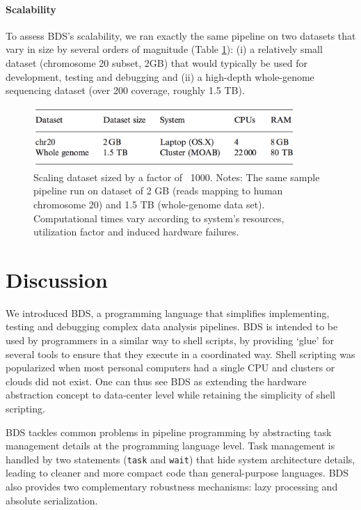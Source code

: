 \paragraph{Scalability} To assess BDS’s scalability, we ran exactly the same pipeline on two datasets that vary in size by several orders of magnitude (Table \ref{fig:bdstablescale}): (i) a relatively small dataset (chromosome 20 subset, 2GB) that would typically be used for development, testing and debugging and (ii) a high-depth whole-genome sequencing dataset (over 200 coverage, roughly 1.5 TB).
 
\begin{figure}
    \centering
    \includegraphics[width=10cm]{bds_table_2.png}
    \caption{Scaling dataset sized by a factor of ~1000. Notes: The same sample pipeline run on dataset of 2 GB (reads mapping to human chromosome 20) and 1.5 TB (whole-genome data set). Computational times vary according to system’s resources, utilization factor and induced hardware failures.}
    \label{fig:bdstablescale}
\end{figure}


\section{Discussion}

We introduced BDS, a programming language that simplifies implementing, testing and debugging complex data analysis pipelines. BDS is intended to be used by programmers in a similar way to shell scripts, by providing ‘glue’ for several tools to ensure that they execute in a coordinated way. Shell scripting was popularized when most personal computers had a single CPU and clusters or clouds did not exist. One can thus see BDS as extending the hardware abstraction concept to data-center level while retaining the simplicity of shell scripting.

BDS tackles common problems in pipeline programming by abstracting task management details at the programming language level. Task management is handled by two statements (\texttt{task} and \texttt{wait}) that hide system architecture details, leading to cleaner and more compact code than general-purpose languages. BDS also provides two complementary robustness mechanisms: lazy processing and absolute serialization.

